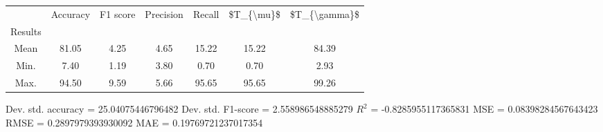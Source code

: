 \begin{tabular}{|c|c|c|c|c|c|c|}
\toprule
{} &  Accuracy &  F1 score &  Precision &  Recall &  \$T\_\{\textbackslash mu\}\$ &  \$T\_\{\textbackslash gamma\}\$ \\
Results &           &           &            &         &            &               \\
\hline
Mean    &     81.05 &      4.25 &       4.65 &   15.22 &      15.22 &         84.39 \\
Min.    &      7.40 &      1.19 &       3.80 &    0.70 &       0.70 &          2.93 \\
Max.    &     94.50 &      9.59 &       5.66 &   95.65 &      95.65 &         99.26 \\
\bottomrule
\end{tabular}

 Dev. std. accuracy = 25.04075446796482
 Dev. std. F1-score = 2.558986548885279
 $R^2$ = -0.8285955117365831
 MSE = 0.08398284567643423
 RMSE = 0.2897979393930092
 MAE = 0.19769721237017354
